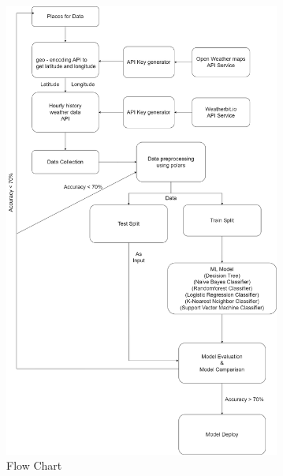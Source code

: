 \documentclass[conference, onecolumn]{IEEEtran}
\begin{document}
\begin{figure}[htbp] %
    \centering
    \includegraphics[width=0.81\textwidth]{"../../images/flow_chart.png"} %
    \caption{Flow Chart}
    \label{Flow Chart}
\end{figure}
\end{document}
